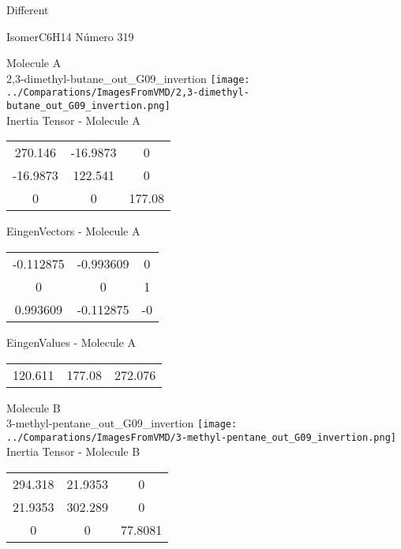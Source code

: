 \begin{center}
\vtab
\vtab
\textcolor{NavyBlue}{\Large Different}
\end{center}

 \newpage

\vtab[-2cm]
\begin{center}
{\large IsomerC6H14 \tab Número 319}
\end{center}
\begin{multicols}{2}
\begin{center}

Molecule A \\ 
2,3-dimethyl-butane\_out\_G09\_invertion
\texttt{[image: ../Comparations/ImagesFromVMD/2,3-dimethyl-butane\_out\_G09\_invertion.png]}
\\
Inertia Tensor - Molecule A \\
\vtab

\begin{tabular}{|c c c|}
270.146	 & 	-16.9873	 & 	0	 \\
-16.9873	 & 	122.541	 & 	0	 \\
0	 & 	0	 & 	177.08
\end{tabular}

\vtab
 EingenVectors - Molecule A     \\
\vtab
\begin{tabular}{|c c c|}
-0.112875	 & 	-0.993609	 & 	0	 \\
0	 & 	0	 & 	1	 \\
0.993609	 & 	-0.112875	 & 	-0
\end{tabular}

\vtab
 EingenValues - Molecule A     \\
\vtab
\begin{tabular}{|c c c|}
120.611	 & 	177.08	 & 	272.076	 \\
\end{tabular}
\columnbreak

Molecule B \\ 
3-methyl-pentane\_out\_G09\_invertion
\texttt{[image: ../Comparations/ImagesFromVMD/3-methyl-pentane\_out\_G09\_invertion.png]}
\\
Inertia Tensor - Molecule B \\
\vtab

\begin{tabular}{|c c c|}
294.318	 & 	21.9353	 & 	0	 \\
21.9353	 & 	302.289	 & 	0	 \\
0	 & 	0	 & 	77.8081
\end{tabular}


\end{center}
\end{multicols}

